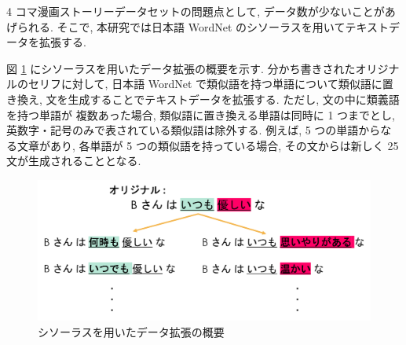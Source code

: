 4 コマ漫画ストーリーデータセットの問題点として, データ数が少ないことがあげられる.
そこで, 本研究では日本語 WordNet \cite{word_net_jp} のシソーラスを用いてテキストデータを拡張する.

図 \ref{fig:data_aug} にシソーラスを用いたデータ拡張の概要を示す.
分かち書きされたオリジナルのセリフに対して, 日本語 WordNet で類似語を持つ単語について類似語に置き換え, 文を生成することでテキストデータを拡張する. ただし, 文の中に類義語を持つ単語が
複数あった場合, 類似語に置き換える単語は同時に 1 つまでとし, 英数字・記号のみで表されている類似語は除外する. 例えば, 5 つの単語からなる文章があり,
各単語が 5 つの類似語を持っている場合, その文からは新しく 25 文が生成されることとなる.

\begin{figure}[h]
  \centering
  \includegraphics[width=0.8\hsize]{doc/figures/data_aug.png}
  \caption{シソーラスを用いたデータ拡張の概要}
  \label{fig:data_aug}
\end{figure}

